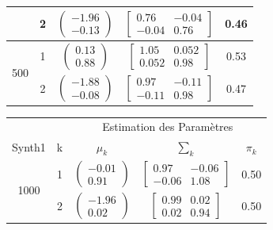 \documentclass[10pt]{article}
\begin{document}
\begin{center}
\begin{tabular}{ | c | c | c | c | c |}
			      											 &   2&        $\begin{pmatrix} -1.96\\-0.13 \end{pmatrix}$          &         $\begin{bmatrix} 0.76 & -0.04 \\ -0.04 & 0.76 \end{bmatrix}$               & 			0.46		\\
		\hline	
		\hline   						
							
		\multirow{2}{*}{500}        &   1&       $\begin{pmatrix} 0.13\\0.88 \end{pmatrix}$            &         	$\begin{bmatrix} 1.05 & 0.052 \\ 0.052 & 0.98 \end{bmatrix}$             & 			0.53		\\\cline{2-5}
		&   2&         $\begin{pmatrix} -1.88\\-0.08 \end{pmatrix}$         &  
		$\begin{bmatrix} 0.97 & -0.11 \\ -0.11 & 0.98 \end{bmatrix}$                      & 		0.47		\\
		
		\hline
		
		\end{tabular} 
	\end{center}
		\begin{center}		
		\begin{tabular}{ | c | c | c | c | c |}
			\rowcolor{lightgray}
			& &  \multicolumn{3}{c|}{Estimation des Paramètres} \\
		Synth1 & k & $\mu_{k}$ & $\sum_{k}$ & $\pi_{k} $\\
			\hline
			\multirow{2}{*}{1000}         &   1&   $\begin{pmatrix} -0.01\\0.91 \end{pmatrix}$           &        	$\begin{bmatrix} 0.97 & -0.06  \\ -0.06  & 1.08\end{bmatrix}$          & 		0.50		\\\cline{2-5}
			         										&   2&       $\begin{pmatrix} -1.96\\0.02 \end{pmatrix}$            &    $\begin{bmatrix} 0.99 & 0.02 \\0.02 & 0.94 \end{bmatrix}$                  & 	0.50				\\
			\hline
			\end{tabular}
		\end{center}
	
\end{document}
